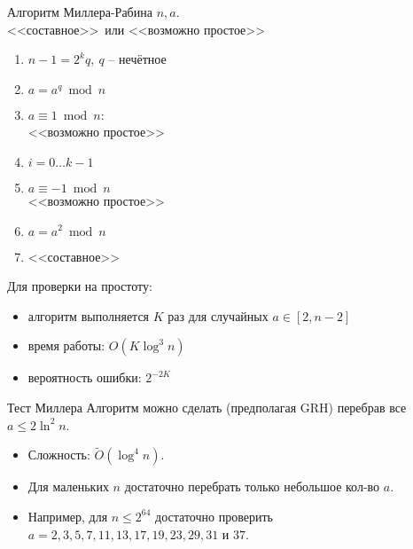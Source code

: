 \documentclass{beamer}
\begin{document}
\begin{frame}{Алгоритм Миллера-Рабина}
     $n, a$.\\
     <<составное>>~или <<возможно простое>>
    \begin{enumerate}
        \item $n-1 = 2^kq,\ q$ -- нечётное
        \item $a = a^q\bmod n$
        \item {} {$a \equiv 1\bmod n$}:\\
        \quad {} <<возможно простое>>
        \item {} {$i = 0 \ldots k-1$}
        \item \quad {} $a\equiv -1\bmod n$ \\
        \quad \quad {} <<возможно простое>>
        \item \quad $a = a^2\bmod n$
        \item {} <<составное>>
    \end{enumerate}
\end{frame}

\begin{frame}
    Для проверки на простоту:
    \vspace{0.5em}
    \begin{itemize}
        \item алгоритм выполняется $K$ раз для случайных $a \in [2, n-2]$
        \item время работы: $O(K \log^3{n})$
        \item вероятность ошибки: $2^{-2 K}$
    \end{itemize}
\end{frame}

\begin{frame}{Тест Миллера}    
	Алгоритм можно сделать  (предполагая GRH) перебрав все $a \leq 2 \ln^2{n}$.
	
	\vspace{0.5em}

	\begin{itemize}
		\item Сложность: $\widetilde{O}(\log^4{n})$.
		\item Для маленьких $n$ достаточно перебрать только небольшое кол-во $a$.
		\item Например, для $n \leq 2^{64}$ достаточно проверить $a = 2, 3, 5, 7, 11, 13, 17, 19, 23, 29, 31$ и $37$. 
	\end{itemize}
\end{frame}
\end{document}
